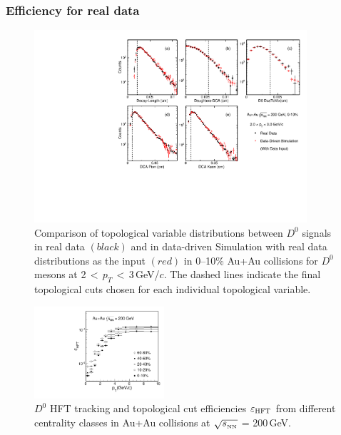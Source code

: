 \documentclass[%
 reprint,	
showpacs,
 amsmath,amssymb,
 aps,
 prc,
]{revtex4-1}
\begin{document}
\subsubsection{Efficiency for real data}
\label{correction:hft:fordata}

\begin{figure}
\centering
\includegraphics[width=0.9\textwidth]{fig/DataTopo.pdf}
\caption{Comparison of topological variable distributions between $D^0$ signals in real data $(black)$ and in data-driven Simulation with real data distributions as the input $(red)$ in 0--10\% Au+Au collisions for $D^0$ mesons at 2\,$<$\,$p_T$\,$<$\,3\,GeV/$c$. The dashed lines indicate the final topological cuts chosen for each individual topological variable.}
\label{fig:DataTopo} 
\end{figure}

\begin{figure}[h]
\centering
\includegraphics[width=0.43\textwidth]{fig/Datad0Eff_hftTopo_10.pdf}
\caption{$D^{0}$ HFT tracking and topological cut efficiencies $\varepsilon_{\rm HFT}$ from different centrality classes in Au+Au collisions at $\sqrt{s_{_{\rm NN}}}$ = 200\,GeV.}
\label{fig:Datad0Eff_hftTopo} 
\end{figure}
\end{document}
